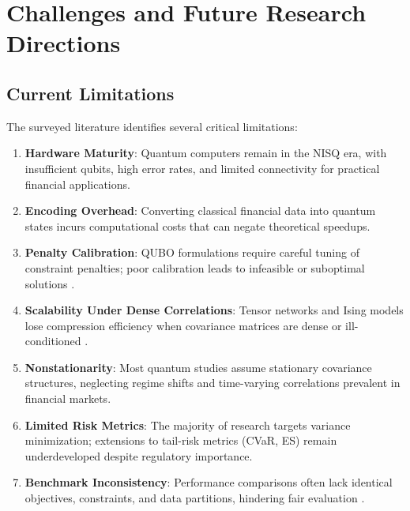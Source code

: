 \documentclass[12pt]{article}
\numberwithin{equation}{section}
\begin{document}
\section{Challenges and Future Research Directions}
\label{sec:challenges}

\subsection{Current Limitations}

The surveyed literature identifies several critical limitations:

\begin{enumerate}[label=\arabic*., leftmargin=*]
\item \textbf{Hardware Maturity}: Quantum computers remain in the NISQ era, with insufficient qubits, high error rates, and limited connectivity for practical financial applications.

\item \textbf{Encoding Overhead}: Converting classical financial data into quantum states incurs computational costs that can negate theoretical speedups.

\item \textbf{Penalty Calibration}: QUBO formulations require careful tuning of constraint penalties; poor calibration leads to infeasible or suboptimal solutions \citep{QIPQUBO2024}.

\item \textbf{Scalability Under Dense Correlations}: Tensor networks and Ising models lose compression efficiency when covariance matrices are dense or ill-conditioned \citep{QITNIndustrial2024}.

\item \textbf{Nonstationarity}: Most quantum studies assume stationary covariance structures, neglecting regime shifts and time-varying correlations prevalent in financial markets.

\item \textbf{Limited Risk Metrics}: The majority of research targets variance minimization; extensions to tail-risk metrics (CVaR, ES) remain underdeveloped despite regulatory importance.

\item \textbf{Benchmark Inconsistency}: Performance comparisons often lack identical objectives, constraints, and data partitions, hindering fair evaluation \citep{Stopfer2025Benchmark}.
\end{enumerate}
\end{document}

